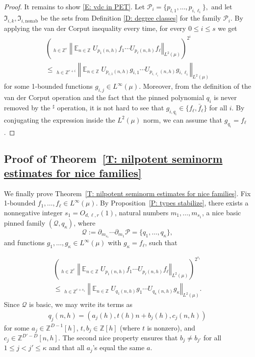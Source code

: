 \documentclass[11pt]{amsart}
\theoremstyle{definition}
\DeclareMathOperator*{\oE}{\overline{\mathbb{E}}}
\DeclareMathOperator*{\E}{\mathbb{E}}
\newcommand{\N}{{\mathbb N}}
\newcommand{\Z}{{\mathbb Z}}
\newcommand{\CP}{{\mathcal P}}
\newcommand{\CQ}{{\mathcal Q}}
\newcommand{\FI}{{\mathfrak I}}
\newcommand{\norm}[1]{\left\Vert #1\right\Vert}
\newcommand{\1}{{\mathbf{1}}}
\newcommand{\nonab}{{\mathrm{nonab}}}
\newcommand{\brac}[1]{\mathopen{}\left( #1 \mathclose{}\right)}
\begin{document}
\begin{proof}
    It remains to show \eqref{E: vdc in PET}. Let $\CP_i= \{p_{l,1}, \ldots, p_{i,\ell_i}\},$ and let $\FI_{i,k}, \FI_{i,\nonab}$ be the sets from Definition \ref{D: degree classes} for the family $\CP_i.$ By applying the van der Corput inequality every time, for every $0\leq i\leq s$ we get
    \begin{multline*}%
    \brac{\oE_{h\in\Z^{r}}\norm{\E_{n\in\Z}U_{p_1(n,h)}f_1\cdots U_{p_\ell(n,h)}f_\ell}_{L^2(\mu)}}^{2^i}\\
    \leq \oE_{h\in \Z^{r+i}}\norm{\E_{n\in\Z}U_{p_{i,1}(n,h)}g_{i,1}\cdots U_{p_{i,\ell_i}(n,h)}g_{i,\ell_i}}_{L^2(\mu)}
    \end{multline*}
    for some 1-bounded functions $g_{i,j}\in L^\infty(\mu)$. 
    Moreover, from the definition of the van der Corput operation and the fact that the pinned polynomial $q_{i}$ is never removed by the $^\sharp$ operation, it is not hard to see that $g_{i,q_{i}}\in\{f_{\ell},\bar f_{\ell}\}$ for all $i$. By conjugating the expression inside the $L^2(\mu)$ norm, we can assume that $g_{q_i} = f_\ell$.
\end{proof}


\subsection{Proof of Theorem~\ref{T: nilpotent seminorm estimates for nice families}}
We finally prove Theorem~\ref{T: nilpotent seminorm estimates for nice families}. %
   Fix 1-bounded $f_1, \ldots, f_\ell\in L^\infty(\mu)$. By Proposition~\ref{P: types stabilize}, there exists a nonnegative integer ${s_1}=O_{d,\ell,r}(1)$, natural numbers $m_1, \ldots, m_{s_1}$, a nice basic {pinned family $(\CQ, q_\kappa)$}, where $$\CQ:=\partial_{m_{s_1}}\cdots\partial_{m_1}\CP = \{q_1, \ldots, q_{\kappa}\},$$ and functions $g_1, \ldots, g_\kappa\in L^\infty(\mu)$ with {$g_\kappa = f_\ell$}, such that



   
   \begin{multline}\label{E: vdC}
 \brac{\oE_{h\in\Z^{r}}\norm{\E_{n\in\Z}U_{p_1(n,h)}f_1\cdots U_{p_\ell(n,h)}f_\ell}_{L^2(\mu)}}^{2^{s_1}}\\
    \leq \oE_{h\in \Z^{r+{s_1}}}\norm{\E_{n\in\Z}U_{q_1(n,h)}g_{1}\cdots U_{q_\kappa(n,h)}g_\kappa}_{L^2(\mu)}.
   \end{multline}    
    Since $\CQ$ is basic, we may write its terms as 
    \begin{align*}
        q_j(n,h) = (a_j(h), t(h)n+b_j(h), c_j(n,h))
    \end{align*}
    for some $a_j\in\Z^{D-1}[h]$, $t,b_j\in\Z[h]$ (where $t$ is nonzero), and $c_j\in\Z^{D'-D}[n,h]$. 
The second nice property ensures that $b_{j}\neq b_{j'}$ for all $1\leq j<j'\leq \kappa$ and that all $a_{j}$'s equal the same $a$.
\end{document}
